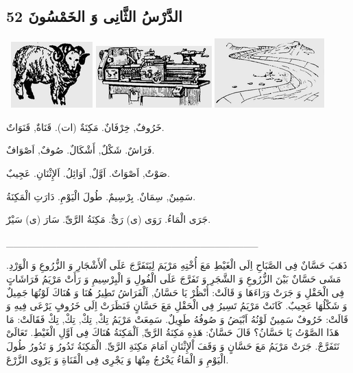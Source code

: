 \documentclass[a5paper]{article}
\begin{document}
\subsection{الدَّرْسُ الثَّانِى وَ الخَمْسُونَ 52}
\  \includegraphics[width=1.2398in,height=1in]{MuhammadBagauddinlatinized-img171.png}   \includegraphics[width=1.7602in,height=0.9374in]{MuhammadBagauddinlatinized-img172.png}   \includegraphics[width=1.6665in,height=1.052in]{MuhammadBagauddinlatinized-img173.png} 

خَرُوفٌ, خِرْفَانٌ. مَكِنَةٌ (ات). قَنَاةٌ, قَنَوَاتٌ. 

فَرَاشٌ. شَكْلٌ, أَشْكَالٌ. صُوفٌ, اَصْوَافٌ. 

صَوْتٌ, اَصْوَاتٌ. اَوَّلٌ, اَوَائِلُ. اَلإِثْنَانِ. عَجِيبٌ. 

سَمِينٌ, سِمَانٌ. بِرْسِيمٌ. طُولَ الْيَوْمِ. دَارَتِ الْمَكِنَةُ. 

جَرَى الْمَاءُ. رَوَى (ى) رَىٌّ. مَكِنَةُ الرَّىِّ. سَارَ (ى) سَيْرٌ.

\_\_\_\_\_\_\_\_\_\_\_\_\_\_\_\_\_\_\_\_\_\_\_\_\_\_\_\_\_\_\_\_\_\_\_

ذَهَبَ حَسَّانٌ فِى الصَّبَاحِ اِلَى الْغَيْطِ مَعَ أُخْتِهِ مَرْيَمَ لِيَتَفَرَّجَ عَلَى اْلأَشْجَارِ وَ الزُّرُوعِ وَ الْوَرْدِ. مَشَى حَسَّانٌ بَيْنَ الزُّرُوعِ وَ الشَّجَرِ وَ تَفَرَّجَ عَلَى الْفُولِ وَ الْبِرْسِيمِ وَ رَأَتْ مَرْيَمُ فَرَاشَاتٍ فِى الْحَقْلِ وَ جَرَتْ وَرَاءَهَا وَ قَالَتْ: أُنْظُرْ يَا حَسَّانُ, اَلْفَرَاشُ تَطِيرُ هُنَا وَ هُنَاكَ لَوْنُهَا جَمِيلٌ وَ شَكْلُهَا عَجِيبٌ. كَانَتْ مَرْيَمُ تَسِيرُ فِى الْحَقْلِ مَعَ حَسَّانٍ فَنَظَرَتْ اِلَى خَرُوفٍ يَرْعَى فِيهِ وَ قَالَتْ: خَرُوفٌ سَمِينٌ لَوْنُهُ اَبْيَضُ وَ صُوفُهُ طَوِيلٌ. سَمِعَتْ مَرْيَمُ تِكْ, تِكْ, تِكْ, تِكْ فَقَالَتْ: مَا هَذَا الصَّوْتُ يَا حَسَّانُ؟ قَالَ حَسَّانٌ: هَذِهِ مَكِنَةُ الرَّىِّ, اَلْمَكِنَةُ هُنَاكَ فِى اَوَّلِ الْغَيْطِ. تَعَالَىْ نَتَفَرَّجْ. جَرَتْ مَرْيَمُ مَعَ حَسَّانٍ وَ وَقَفَ اْلإِثْنَانِ اَمَامَ مَكِنَةِ الرَّىِّ. الْمَكِنَةُ تَدُورُ وَ تَدُورُ طُولَ الْيَوْمِ وَ الْمَاءُ يَخْرُجُ مِنْهَا وَ يَجْرِى فِى الْقَنَاةِ وَ يَرْوِى الزَّرْعَ. 
\end{document}
